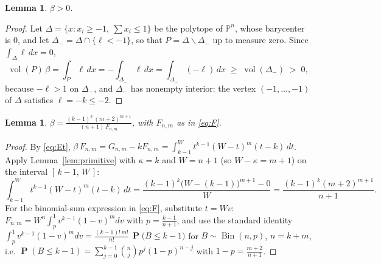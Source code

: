 \documentclass[11pt]{amsart}
\newtheorem{lemma}[theorem]{Lemma}
\theoremstyle{definition}
\theoremstyle{remark}
\newcommand{\PP}{\mathbb{P}}
\newcommand{\vol}{\operatorname{vol}}
\newcommand{\Bin}{\operatorname{Bin}}
\newcommand{\pr}{\operatorname{\mathbf{P}}}
\begin{document}
\begin{lemma}\label{lem:positive}
$\beta>0$.
\end{lemma}

\begin{proof}
Let $\Delta=\{x:x_i\ge-1,\ \sum x_i\le1\}$ be the polytope of
$\PP^n$, whose barycenter is $0$, and let
$\Delta_-=\Delta\cap\{\ell<-1\}$, so that $P=\Delta\smallsetminus
\Delta_-$ up to measure zero. Since $\int_\Delta\ell\,dx=0$,
\[
\vol(P)\,\beta=\int_P\ell\,dx=-\int_{\Delta_-}\ell\,dx
=\int_{\Delta_-}(-\ell)\,dx\;\ge\;\vol(\Delta_-)\;>\;0 ,
\]
because $-\ell>1$ on $\Delta_-$, and $\Delta_-$ has nonempty interior:
the vertex $(-1,\dots,-1)$ of $\Delta$ satisfies $\ell=-k\le-2$.
\end{proof}

\begin{lemma}\label{lem:closedbeta}
$\displaystyle
\beta=\frac{(k-1)^{k}\,(m+2)^{m+1}}{(n+1)\,F_{n,m}}$, with $F_{n,m}$ as
in \eqref{eq:F}.
\end{lemma}

\begin{proof}
By \eqref{eq:Et},
$\beta\,F_{n,m}=G_{n,m}-kF_{n,m}
=\int_{k-1}^{W}t^{k-1}(W-t)^{m}(t-k)\,dt$. Apply
Lemma~\ref{lem:primitive} with $\kappa=k$ and $W=n+1$ (so
$W-\kappa=m+1$) on the interval $[\,k-1,\,W\,]$:
\[
\int_{k-1}^{W}t^{k-1}(W-t)^{m}(t-k)\,dt
=\frac{(k-1)^{k}\bigl(W-(k-1)\bigr)^{m+1}-0}{W}
=\frac{(k-1)^{k}(m+2)^{m+1}}{n+1}.
\]
For the binomial-sum expression in \eqref{eq:F}, substitute $t=Wv$:
$F_{n,m}=W^{n}\int_{p}^{1}v^{k-1}(1-v)^{m}dv$ with $p=\frac{k-1}{n+1}$,
and use the standard identity
$\int_{p}^{1}v^{k-1}(1-v)^{m}dv
=\tfrac{(k-1)!\,m!}{n!}\,\pr\bigl(B\le k-1\bigr)$ for
$B\sim\Bin(n,p)$, $n=k+m$, i.e.
$\pr(B\le k-1)=\sum_{j=0}^{k-1}\binom nj p^j(1-p)^{n-j}$ with
$1-p=\frac{m+2}{n+1}$.
\end{proof}
\end{document}
